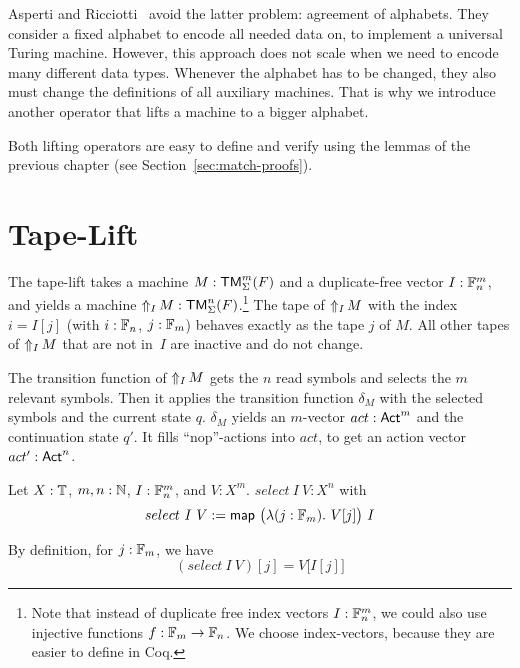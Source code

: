 Asperti and Ricciotti~\cite{asperti2015} avoid the latter problem: agreement of alphabets.  They consider a fixed alphabet to encode all needed data
on, to implement a universal Turing machine.  However, this approach does not scale when we need to encode many different data types.  Whenever the
alphabet has to be changed, they also must change the definitions of all auxiliary machines.  That is why we introduce another operator that lifts a
machine to a bigger alphabet.

Both lifting operators are easy to define and verify using the lemmas of the previous chapter (see Section~\ref{sec:match-proofs}).


\section{Tape-Lift}
\label{sec:n-Lift}
%

The tape-lift takes a machine $M:\TM_\Sigma^m(F)$ and a duplicate-free vector $I: \Fin_n^m$, and yields a machine
$\LiftTapes{M}{I} : \TM_\Sigma^n(F)$.\footnote{ Note that instead of duplicate free index vectors $I:\Fin_n^m$, we could also use injective functions
  $f: \Fin_m \to \Fin_n$.  We choose index-vectors, because they are easier to define in Coq.}  The tape of $\LiftTapes{M}{I}$ with the index
$i = I[j]$ (with $i:\Fin_n$, $j:\Fin_m$) behaves exactly as the tape $j$ of $M$.  All other tapes of $\LiftTapes{M}{I}$ that are not in~$I$ are
inactive and do not change.


The transition function of $\LiftTapes{M}{I}$ gets the $n$ read symbols and selects the $m$ relevant symbols.  Then it applies the transition function
$\delta_M$ with the selected symbols and the current state $q$.  $\delta_M$ yields an $m$-vector $act:\Act^m$ and the continuation state $q'$.  It
fills ``nop''-actions into $act$, to get an action vector $act':\Act^n$.

\begin{definition}
  \label{def:select}
  Let $X:\Type$, $m,n:\Nat$, $I : \Fin_n^m$, and $V : X^m$.  $select~I~V : X^n$ with
  \[ select~I~V := \map{\bigl(\lambda (j:\Fin_m).~V[j] \bigr)}{I} \]
\end{definition}
\begin{lemma}
  By definition, for $j:\Fin_m$, we have
  \[
    (select~I~V)[j]=V\bigl[I[j]\bigr]
  \]
\end{lemma}

